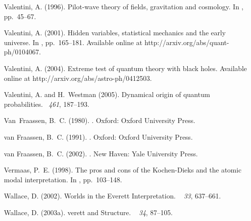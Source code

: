 \documentclass[12pt]{article}
\begin{document}
\begin{thebibliography}{}
Valentini, A. (1996).
\newblock Pilot-wave theory of fields, gravitation and cosmology.
\newblock In , pp.\  45--67.

Valentini, A. (2001).
\newblock Hidden variables, statistical mechanics and the early universe.
\newblock In , pp.\  165--181.
\newblock Available online at http://arxiv.org/abs/quant-ph/0104067.

Valentini, A. (2004).
\newblock Extreme test of quantum theory with black holes.
\newblock Available online at http://arxiv.org/abs/astro-ph/0412503.

Valentini, A. and H.~Westman (2005).
\newblock Dynamical origin of quantum probabilities.
~{\em 461},
  187--193.

Van~Fraassen, B.~C. (1980).
.
\newblock Oxford: Oxford University Press.

van Fraassen, B.~C. (1991).
.
\newblock Oxford: Oxford University Press.

van Fraassen, B.~C. (2002).
.
\newblock New Haven: Yale University Press.

Vermaas, P.~E. (1998).
\newblock The pros and cons of the {K}ochen-{D}ieks and the atomic modal
  interpretation.
\newblock In , pp.\  103--148.

Wallace, D. (2002).
\newblock Worlds in the {E}verett {I}nterpretation.
~{\em
  33}, 637--661.

Wallace, D. (2003a).
verett and {S}tructure.
~{\em
  34}, 87--105.


\end{thebibliography}
\end{document}
